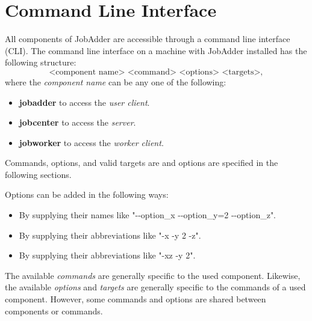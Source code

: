 \newcommand{\jacommand}[3]{
\textsc{\LARGE{\textbf{#1}}}
\begin{itemize}
\item \textbf{Options:} #2
\item \textbf{Effect:} #3
\end{itemize}
}
\newcommand{\jaoptionheader}{\textsc{\textbf{Option descriptions:}}\newline\newline}
\newcommand{\jaoption}[3]{
\textbf{#1}
\begin{itemize}
\item \textbf{Short form:} #2
\item \textbf{Effect:} #3
\end{itemize}
}
\chapter{Command Line Interface}
All components of JobAdder are accessible through a command line interface (CLI).
The command line interface on a machine with JobAdder installed has the following structure:
\begin{equation}
\text{<component name> <command> <options> <targets>},
\end{equation}
where the \textit{component name} can be any one of the following:
\begin{itemize}
\item \textbf{jobadder} to access the \textit{user client}.
\item \textbf{jobcenter} to access the \textit{server}.
\item \textbf{jobworker} to access the \textit{worker client}.
\end{itemize}
Commands, options, and valid targets are and options are specified in the following sections.

Options can be added in the following ways:
\begin{itemize}
\item By supplying their names like "-{}-option\_x -{}-option\_y=2 -{}-option\_z".
\item By supplying their abbreviations like "-x -y 2 -z".
\item By supplying their abbreviations like "-xz -y 2".
\end{itemize}

The available \textit{commands} are generally specific to the used component.
Likewise, the available \textit{options} and \textit{targets} are generally specific to the commands of a used component.
However, some commands and options are shared between components or commands.

